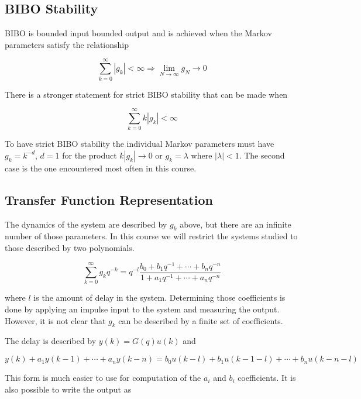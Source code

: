 \subsection{BIBO Stability}%
\label{sec:bibostability}
BIBO is bounded input bounded output and is achieved when the Markov parameters satisfy the relationship

\begin{equation*}
\sum_{k=0}^\infty |g_k| < \infty \Rightarrow \lim_{N\to \infty} g_N \to 0
\end{equation*}

There is a stronger statement for strict BIBO stability that can be made when

\begin{equation*}
\sum_{k=0}^\infty k|g_k| < \infty
\end{equation*}

To have strict BIBO stability the individual Markov parameters must have $g_k=k^{-d}$, $d=1$ for the product $k|g_k|\to 0$ or $g_k=\lambda$ where $|\lambda|<1$.
The second case is the one encountered most often in this course.

\subsection{Transfer Function Representation}
The dynamics of the system are described by $g_k$ above, but there are an infinite number of those parameters.
In this course we will restrict the systems studied to those described by two polynomials.

\begin{equation*}
\sum_{k=0}^\infty g_k q^{-k} = q^{-l} \frac{b_0 + b_1 q^{-1} + \cdots + b_n q^{-n}}{1+a_1 q^{-1} + \cdots + a_n q^{-n}}
\end{equation*}

where $l$ is the amount of delay in the system.
Determining those coefficients is done by applying an impulse input to the system and measuring the output.
However, it is not clear that $g_k$ can be described by a finite set of coefficients.

The delay is described by $y(k) = G(q)u(k)$ and

\begin{equation*}
y(k) + a_1 y(k-1)+\cdots + a_n y(k-n) = b_0 u(k-l)+b_1 u(k-1-l) + \cdots + b_n u(k-n-l)
\end{equation*}

This form is much easier to use for computation of the $a_i$ and $b_i$ coefficients.
It is also possible to write the output as

